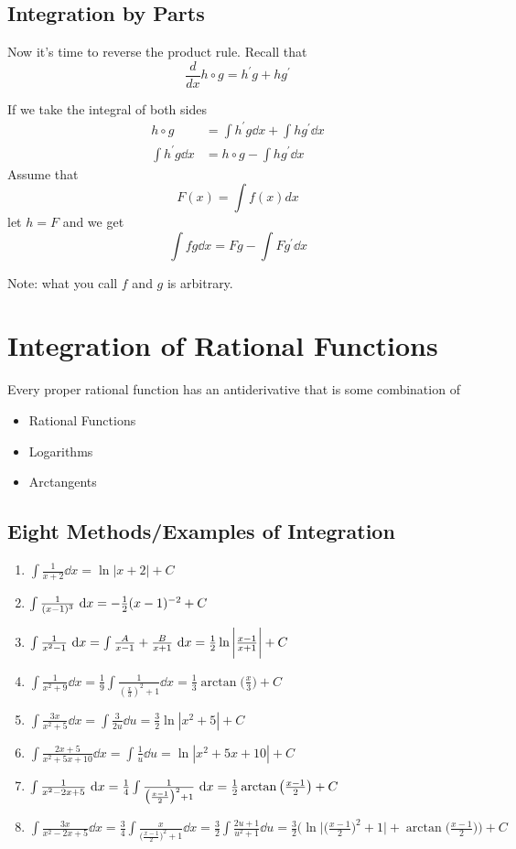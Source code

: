 \documentclass[12pt]{article}
\newcommand{\inint}[2]{\int #1 \dd #2}
\begin{document}
\subsection*{Integration by Parts}
Now it's time to reverse the product rule. Recall that \[ \frac{d}{dx} h\circ g = h^\prime g + hg^\prime \]

If we take the integral of both sides
\begin{align*}
h\circ g &= \inint{h^\prime g}{x} + \inint{hg^\prime}{x}\\
\inint{h^\prime g}{x} &= h\circ g - \inint{hg^\prime}{x}
\end{align*}
Assume that \[ F(x) = \int\! f(x)dx \] let $h = F$ and we get \[ \inint{fg}{x} = Fg - \inint{Fg^\prime}{x} \]

Note: what you call $f$ and $g$ is arbitrary.

\section*{Integration of Rational Functions}
Every proper rational function has an antiderivative that is some combination of
\begin{itemize}
\item Rational Functions
\item Logarithms
\item Arctangents
\end{itemize}

\subsection*{Eight Methods/Examples of Integration}
\begin{enumerate}
\item $\inint{\frac{1}{x+2}}{x} = \ln|x+2| + C$
\item $\inint{\frac{1}{(x-1)^3}}{x} = -\half (x-1)^{-2} + C$
\item $\inint{\frac{1}{x^2-1}}{x} = \inint{\frac{A}{x-1}+\frac{B}{x+1}}{x} = \half \ln\bigg|\frac{x-1}{x+1}\bigg| + C$
\item $\inint{\frac{1}{x^2+9}}{x} = \frac{1}{9}\inint{\frac{1}{(\frac{x}{3})^2+1}}{x} = \frac{1}{3}\arctan\bigg(\frac{x}{3}\bigg) + C$
\item $\inint{\frac{3x}{x^2+5}}{x} = \inint{\frac{3}{2u}}{u} = \frac{3}{2}\ln|x^2+5| + C$
\item $\inint{\frac{2x+5}{x^2+5x+10}}{x} = \inint{\frac{1}{u}}{u} = \ln|x^2+5x+10| + C$
\item $\inint{\frac{1}{x^2-2x+5}}{x} = \quarter \inint{\frac{1}{\big(\frac{x-1}{2}\big)^2+1}}{x} = \half \arctan\big(\frac{x-1}{2}\big) + C$
\item $\inint{\frac{3x}{x^2-2x+5}}{x} = \frac{3}{4}\inint{\frac{x}{\big(\frac{x-1}{2}\big)^2+1}}{x} = \frac{3}{2}\inint{\frac{2u+1}{u^2+1}}{u} = \frac{3}{2}\bigg(\ln\big|\big(\frac{x-1}{2}\big)^2 + 1\big| + \arctan\big(\frac{x-1}{2}\big)\bigg) + C$
\end{enumerate}
\end{document}
